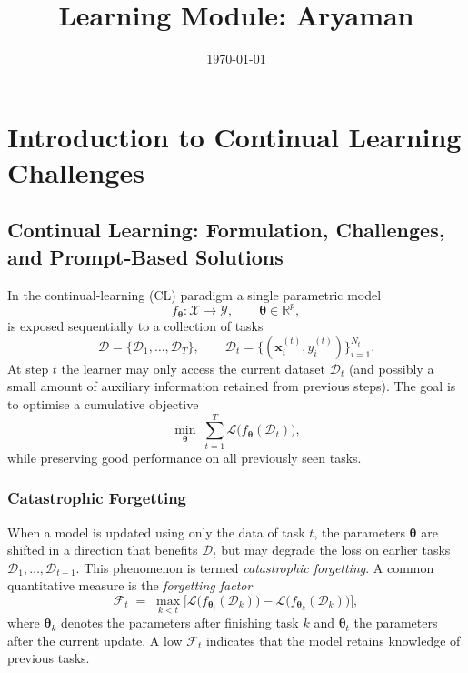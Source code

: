 \documentclass[12pt, a4paper]{article}
\title{Learning Module: Aryaman}
\author{}
\date{\today}
\begin{document}
\maketitle
\thispagestyle{empty}
\newpage

\tableofcontents
\newpage


\section{Introduction to Continual Learning Challenges}

\subsection{Continual Learning: Formulation, Challenges, and Prompt‑Based Solutions}

In the continual‑learning (CL) paradigm a single parametric model 
\[
f_{\boldsymbol \theta}:\mathcal X\rightarrow\mathcal Y ,
\qquad \boldsymbol \theta\in\mathbb R^{p},
\]
is exposed sequentially to a collection of tasks 
\[
\mathcal D=\{\mathcal D_{1},\dots ,\mathcal D_{T}\},
\qquad 
\mathcal D_{t}=\{(\mathbf x^{(t)}_{i},y^{(t)}_{i})\}_{i=1}^{N_{t}} .
\]
At step $t$ the learner may only access the current dataset $\mathcal D_{t}$ (and possibly a small amount of auxiliary information retained from previous steps). The goal is to optimise a cumulative objective
\[
\min_{\boldsymbol\theta}\; \sum_{t=1}^{T}\mathcal L\bigl(f_{\boldsymbol\theta}(\mathcal D_{t})\bigr),
\tag{1}
\]
while preserving good performance on all previously seen tasks.

\subsubsection{Catastrophic Forgetting}
When a model is updated using only the data of task $t$, the parameters $\boldsymbol\theta$ are shifted in a direction that benefits $\mathcal D_{t}$ but may degrade the loss on earlier tasks $\mathcal D_{1},\dots ,\mathcal D_{t-1}$. This phenomenon is termed \emph{catastrophic forgetting}. A common quantitative measure is the \emph{forgetting factor}
\[
\mathcal F_{t} \;=\; \max_{k<t}\bigl[ \mathcal L\bigl(f_{\boldsymbol\theta_{t}}(\mathcal D_{k})\bigr) 
        - \mathcal L\bigl(f_{\boldsymbol\theta_{k}}(\mathcal D_{k})\bigr) \bigr],
\tag{2}
\]
where $\boldsymbol\theta_{k}$ denotes the parameters after finishing task $k$ and $\boldsymbol\theta_{t}$ the parameters after the current update. A low $\mathcal F_{t}$ indicates that the model retains knowledge of previous tasks.
\end{document}
